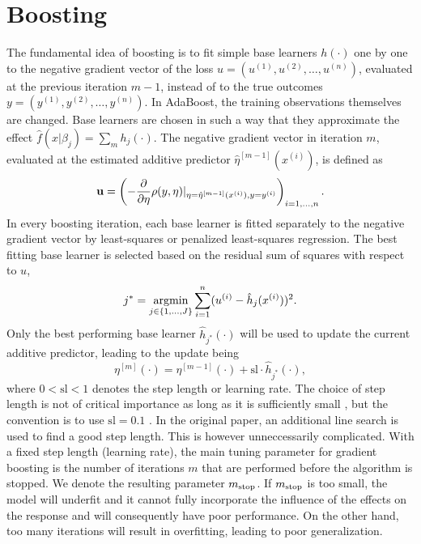 \section{Boosting}
The fundamental idea of boosting is to fit simple base learners $h(\cdot)$ one by one to the negative gradient vector of the loss $u=(u^{(1)},u^{(2)},\ldots,u^{(n)})$, evaluated at the previous iteration $m-1$, instead of to the true outcomes $y=(y^{(1)},y^{(2)},\ldots,y^{(n)})$. In AdaBoost, the training observations themselves are changed. Base learners are chosen in such a way that they approximate the effect $\hat{f}(x|\beta_j)=\sum_mh_j(\cdot)$. The negative gradient vector in iteration $m$, evaluated at the estimated additive predictor $\hat{\eta}^{[m-1]}(x^{(i)})$, is defined as
\begin{equation*}
    \mathbf{u}=\left(-\frac{\partial}{\partial\eta}\rho(y,\eta)\rvert_{\eta=\hat{\eta}^{[m-1]}(x^{(i)}),y=y^{(i)}}\right)_{i=1,\ldots,n}.
\end{equation*}
In every boosting iteration, each base learner is fitted separately to the negative gradient vector by least-squares or penalized least-squares regression.
The best fitting base learner is selected based on the residual sum of squares with respect to $u$,
\begin{equation*}
    j^*=\operatorname*{argmin}_{j\in\{1,\ldots,J\}}\sum_{i=1}^{n}(u^{(i)}-\hat{h}_j(x^{(i)}))^2.
\end{equation*}
Only the best performing base learner $\hat{h}_{j^*}(\cdot)$ will be used to update the current additive predictor, leading to the update being
\begin{equation*}
    \eta^{[m]}(\cdot)=\eta^{[m-1]}(\cdot)+\text{sl}\cdot\hat{h}_{j^*}(\cdot),
\end{equation*}
where $0<\text{sl}<1$ denotes the step length or learning rate. The choice of step length is not of critical importance as long as it is sufficiently small \citep{schmid-hothorn}, but the convention is to use $\text{sl}=0.1$ \citep{mayr14a}. In the original paper, an additional line search is used to find a good step length. This is however unneccessarily complicated. With a fixed step length (learning rate), the main tuning parameter for gradient boosting is the number of iterations $m$ that are performed before the algorithm is stopped. We denote the resulting parameter $m_{\text{stop}}$. If $m_{\text{stop}}$ is too small, the model will underfit and it cannot fully incorporate the influence of the effects on the response and will consequently have poor performance. On the other hand, too many iterations will result in overfitting, leading to poor generalization.

